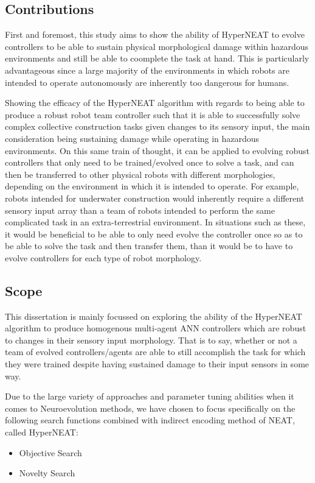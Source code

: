 \subsection{Contributions}

First and foremost, this study aims to show the ability of HyperNEAT to evolve controllers to be able to sustain physical morphological damage within hazardous environments and still be able to coomplete the task at hand. This is particularly advantageous since a large majority of the environments in which robots are intended to operate autonomously are inherently too dangerous for humans.

Showing the efficacy of the HyperNEAT algorithm with regards to being able to produce a robust robot team controller such that it is able to successfully solve complex collective construction tasks given changes to its sensory input, the main consideration being sustaining damage while operating in hazardous environments. On this same train of thought, it can be applied to evolving robust controllers that only need to be trained/evolved once to solve a task, and can then be transferred to other physical robots with different morphologies, depending on the environment in which it is intended to operate. For example, robots intended for underwater construction would inherently require a different sensory input array than a team of robots intended to perform the same complicated task in an extra-terrestrial environment. In situations such as these, it would be beneficial to be able to only need evolve the controller once so as to be able to solve the task and then transfer them, than it would be to have to evolve controllers for each type of robot morphology.


\subsection{Scope}

This dissertation is mainly focussed on exploring the ability of the HyperNEAT algorithm to produce homogenous multi-agent ANN controllers which are robust to changes in their sensory input morphology. That is to say, whether or not a team of evolved controllers/agents are able to still accomplish the task for which they were trained despite having sustained damage to their input sensors in some way.

Due to the large variety of approaches and parameter tuning abilities when it comes to Neuroevolution methods, we have chosen to focus specifically on the following search functions combined with indirect encoding method of NEAT, called HyperNEAT:
\begin{itemize}
	\item Objective Search
	\item Novelty Search
\end{itemize}


